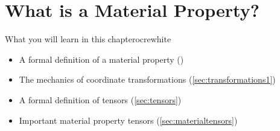 %




\renewcommand{\chaptergraphicspath}{../src/MaterialProperty/eps/}

\renewcommand{\chabbr}{MATPRP}

\chapter{What is a Material Property?}

\begin{messagebox}{What you will learn in this chapter}{ocre}{\icinfo}{white}
\begin{itemize}
	\item A formal definition of a material property ()
	\item The mechanics of coordinate transformations (\ref{sec:transformations1})
	\item A formal definition of tensors (\ref{sec:tensors})
	\item Important material property tensors (\ref{sec:materialtensors})
\end{itemize}
\end{messagebox}

